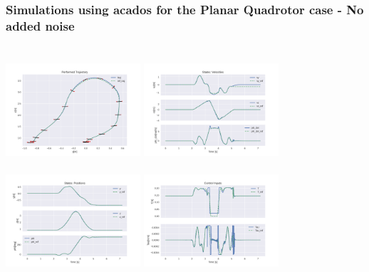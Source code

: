 \documentclass{thesisbeamer}
\newcommand\Fontvi{\fontsize{9}{10}\selectfont}
\begin{document}
\begin{frame}
	\frametitle{Simulations using acados for the Planar Quadrotor case - No added noise}
	\Fontvi
	
	\begin{columns}[t]
		\centering
			\includegraphics[width=5cm,height=4cm]{Images/acados_simulations/flip_trajectory/planar_quadrotor/noiseless/sim.png}
			\includegraphics[width=5cm,height=4cm]{Images/acados_simulations/flip_trajectory/planar_quadrotor/noiseless/rateStates.png}
			\centering
			\includegraphics[width=5cm,height=4cm]{Images/acados_simulations/flip_trajectory/planar_quadrotor/noiseless/posStates.png}
			\includegraphics[width=5cm,height=4cm]{Images/acados_simulations/flip_trajectory/planar_quadrotor/noiseless/controlInputs.png}
	\end{columns}
	
	
\end{frame}
\end{document}

